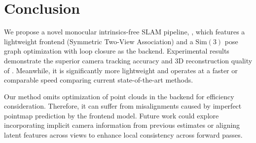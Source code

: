 \vspace{-0.2em}
\section{Conclusion}
\label{sec:conclusion}


We propose a novel monocular intrinsics-free SLAM pipeline, \ours, which features a lightweight frontend (Symmetric Two-View Association) and a $\mathrm{Sim}(3)$ pose graph optimization with loop closure as the backend. Experimental results demonstrate the superior camera tracking accuracy and 3D reconstruction quality of \ours. Meanwhile, it is significantly more lightweight and operates at a faster or comparable speed comparing current state-of-the-art methods.

Our method omits optimization of point clouds in the backend for efficiency consideration. Therefore, it can suffer from misalignments caused by imperfect pointmap prediction by the frontend model. %
Future work could explore incorporating implicit camera information from previous estimates or aligning latent features across views to enhance local consistency across forward passes.
